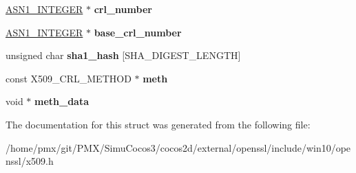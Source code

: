 \begin{DoxyCompactItemize}
\mbox{\label{structX509__crl__st_a38d84a6c190dc370d74e145cd4faa8d4}} 
\hyperlink{structasn1__string__st}{A\+S\+N1\+\_\+\+I\+N\+T\+E\+G\+ER} $\ast$ {\bfseries crl\+\_\+number}
\item 
\mbox{\label{structX509__crl__st_a758731f9f2c7efcbf2d7e8c6e0b01278}} 
\hyperlink{structasn1__string__st}{A\+S\+N1\+\_\+\+I\+N\+T\+E\+G\+ER} $\ast$ {\bfseries base\+\_\+crl\+\_\+number}
\item 
\mbox{\label{structX509__crl__st_a1040792ec929f92137cb677e58cc8e94}} 
unsigned char {\bfseries sha1\+\_\+hash} \mbox{[}S\+H\+A\+\_\+\+D\+I\+G\+E\+S\+T\+\_\+\+L\+E\+N\+G\+TH\mbox{]}
\item 
\mbox{\label{structX509__crl__st_a7fbfb8e62320e2a6275153c832c2ccd5}} 
const X509\+\_\+\+C\+R\+L\+\_\+\+M\+E\+T\+H\+OD $\ast$ {\bfseries meth}
\item 
\mbox{\label{structX509__crl__st_a409391d6ea1a661d0c27c84e26b9676b}} 
void $\ast$ {\bfseries meth\+\_\+data}
\end{DoxyCompactItemize}


The documentation for this struct was generated from the following file\+:\begin{DoxyCompactItemize}
\item 
/home/pmx/git/\+P\+M\+X/\+Simu\+Cocos3/cocos2d/external/openssl/include/win10/openssl/x509.\+h\end{DoxyCompactItemize}
